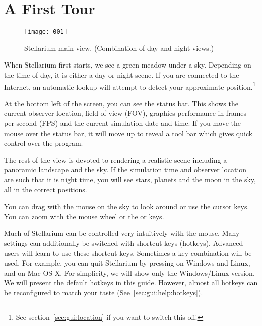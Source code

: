 

\chapter{A First Tour}
\label{ch:tour}


\begin{figure}[tbh]\centering
\texttt{[image: 001]}
\caption{Stellarium main view. (Combination of day and night views.)}
\label{fig:001}
\end{figure}

\noindent When Stellarium first starts, we see a green meadow under a
sky. Depending on the time of day, it is either a day or night
scene. If you are connected to the Internet, an automatic lookup will
attempt to detect your approximate position.\footnote{See
  section~\ref{sec:gui:location} if you want to switch this off.}

At the bottom left of the screen, you can see the status bar. This shows
the current observer location, field of view (FOV), graphics performance
in frames per second (FPS) and the current simulation date and time.
If you move the mouse over the status bar, it will move up to reveal a
tool bar which gives quick control over the program.

The rest of the view is devoted to rendering a realistic scene including
a panoramic landscape and the sky. If the simulation time and observer
location are such that it is night time, you will see stars, planets and
the moon in the sky, all in the correct positions.

You can drag with the mouse on the sky to look around or use the
cursor keys. You can zoom with the mouse wheel or the  or  keys.

Much of Stellarium can be controlled very intuitively with the
mouse. Many settings can additionally be switched with shortcut keys
(hotkeys).  Advanced users will learn to use these shortcut
keys. Sometimes a key combination will be used. For example, you can
quit Stellarium by pressing  on Windows and Linux, and
 on Mac OS X.  For simplicity, we will show only the
Windows/Linux version. We will present the default hotkeys in this
guide. However, almost all hotkeys can be reconfigured to match your
taste (See~\ref{sec:gui:help:hotkeys}).


